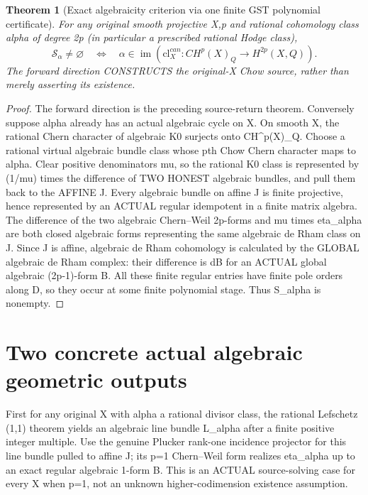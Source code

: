 \documentclass[11pt]{article}
\newtheorem{theorem}{Theorem}[section]
\begin{document}
\begin{theorem}[Exact algebraicity criterion via one finite GST polynomial certificate]
For any original smooth projective X,p and rational
cohomology class alpha of degree 2p (in particular
a prescribed rational Hodge class),
\[
 \boxed{
 \mathscr S_\alpha\ne\varnothing
 \quad\Longleftrightarrow\quad
 \alpha\in\operatorname{im}
   (\mathrm{cl}^{can}_X:CH^p(X)_Q\to H^{2p}(X,Q)).
 }                                                     \tag{6}
\]
The forward direction CONSTRUCTS the original-X Chow source,
rather than merely asserting its existence.
\end{theorem}
\begin{proof}
The forward direction is the preceding source-return theorem.
Conversely suppose alpha already has an actual algebraic cycle
on X. On smooth X, the rational Chern character of algebraic K0
surjects onto CH^p(X)_Q. Choose a rational virtual
algebraic bundle class whose pth Chow Chern character maps to alpha.
Clear positive denominators mu, so the rational K0 class
is represented by (1/mu) times the difference of TWO
HONEST algebraic bundles,
and pull them back to the AFFINE J. Every algebraic bundle
on affine J is finite projective, hence represented by an
ACTUAL regular idempotent in a finite matrix algebra.
The difference of the two algebraic Chern--Weil 2p-forms
and mu times eta_alpha are both closed algebraic forms representing
the same algebraic de Rham class on J.
Since J is affine, algebraic de Rham cohomology is calculated
by the GLOBAL algebraic de Rham complex:
their difference is dB for an ACTUAL global algebraic
(2p-1)-form B. All these finite regular entries have finite
pole orders along D, so they occur at some finite polynomial
stage. Thus S_alpha is nonempty.
\end{proof}

\section{Two concrete actual algebraic geometric outputs}
First for any original X with alpha a rational divisor class,
the rational Lefschetz (1,1) theorem yields an algebraic line
bundle L_alpha after a finite positive integer multiple.
Use the genuine Plucker rank-one incidence projector for this
line bundle pulled to affine J; its p=1 Chern--Weil form
realizes eta_alpha up to an exact regular algebraic 1-form B.
This is an ACTUAL source-solving case for every X when p=1,
not an unknown higher-codimension existence assumption.
\end{document}
